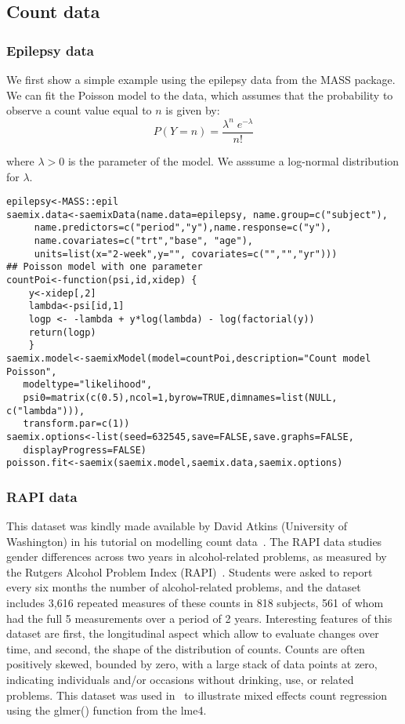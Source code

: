 \subsection{Count data} 

\subsubsection{Epilepsy data} \label{sec:epilepsyCount}

We first show a simple example using the epilepsy data from the MASS package. We can fit the Poisson model to the data, which assumes that the probability to observe a count value equal to $n$ is given by:
\begin{equation}
P(Y=n) = \frac{\lambda^n \; e^{-\lambda}}{n!}
\end{equation}

where $\lambda>0$ is the parameter of the model. We asssume a log-normal distribution for $\lambda$.

\begin{verbatim}
epilepsy<-MASS::epil
saemix.data<-saemixData(name.data=epilepsy, name.group=c("subject"),
     name.predictors=c("period","y"),name.response=c("y"),
     name.covariates=c("trt","base", "age"), 
     units=list(x="2-week",y="", covariates=c("","","yr")))
## Poisson model with one parameter
countPoi<-function(psi,id,xidep) { 
    y<-xidep[,2]
    lambda<-psi[id,1]
    logp <- -lambda + y*log(lambda) - log(factorial(y))
    return(logp)
    }
saemix.model<-saemixModel(model=countPoi,description="Count model Poisson",
   modeltype="likelihood", 
   psi0=matrix(c(0.5),ncol=1,byrow=TRUE,dimnames=list(NULL, c("lambda"))), 
   transform.par=c(1))
saemix.options<-list(seed=632545,save=FALSE,save.graphs=FALSE, 
   displayProgress=FALSE)
poisson.fit<-saemix(saemix.model,saemix.data,saemix.options)
\end{verbatim}


\subsubsection{RAPI data} \label{sec:RAPICount}

This dataset was kindly made available by David Atkins (University of Washington) in his tutorial on modelling count data~\cite{Atkins13}. The RAPI data studies gender differences across two years in alcohol-related problems, as measured by the Rutgers Alcohol Problem Index (RAPI)~\cite{White89}. Students were asked to report every six months the number of alcohol-related problems, and the dataset includes 3,616 repeated measures of these counts in 818 subjects, 561 of whom had the full 5 measurements over a period of 2 years. Interesting features of this dataset are first, the longitudinal aspect which allow to evaluate changes over time, and second, the shape of the distribution of counts. Counts are often positively skewed, bounded by zero, with a large stack of data points at zero, indicating individuals and/or occasions without drinking, use, or related problems. This dataset was used in~\cite{Atkins13} to illustrate mixed effects count regression using the {\sf glmer()} function from the {\sf lme4}.

